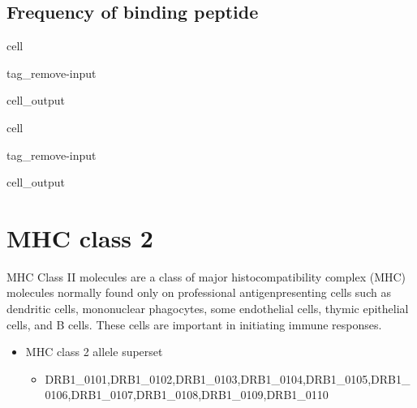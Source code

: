\documentclass[letterpaper,10pt,english]{jupyterBook}
\begin{document}
\subsection{Frequency of binding peptide}
\label{\detokenize{ipynb/chapter2:frequency-of-binding-peptide}}
\begin{sphinxuseclass}{cell}
\begin{sphinxuseclass}{tag_remove-input}\begin{sphinxVerbatimOutput}

\begin{sphinxuseclass}{cell_output}
\noindent{}

\end{sphinxuseclass}\end{sphinxVerbatimOutput}

\end{sphinxuseclass}
\end{sphinxuseclass}
\begin{sphinxuseclass}{cell}
\begin{sphinxuseclass}{tag_remove-input}\begin{sphinxVerbatimOutput}

\begin{sphinxuseclass}{cell_output}
\noindent{}

\end{sphinxuseclass}\end{sphinxVerbatimOutput}

\end{sphinxuseclass}
\end{sphinxuseclass}

\section{MHC class 2}
\label{\detokenize{ipynb/chapter2:mhc-class-2}}
\sphinxAtStartPar
MHC Class II molecules are a class of major histocompatibility complex (MHC) molecules normally found only on professional antigen\sphinxhyphen{}presenting cells such as dendritic cells, mononuclear phagocytes, some endothelial cells, thymic epithelial cells, and B cells. These cells are important in initiating immune responses.
\begin{itemize}
\item {} 
\sphinxAtStartPar
MHC class 2 allele superset
\begin{itemize}
\item {} 
\sphinxAtStartPar
DRB1\_0101,DRB1\_0102,DRB1\_0103,DRB1\_0104,DRB1\_0105,DRB1\_0106,DRB1\_0107,DRB1\_0108,DRB1\_0109,DRB1\_0110

\end{itemize}

\end{itemize}
\end{document}

